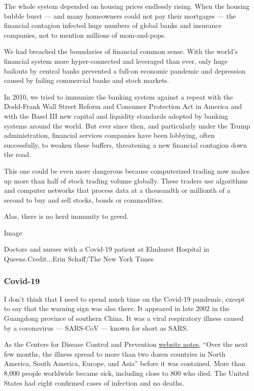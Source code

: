 The whole system depended on housing prices endlessly rising. When the
housing bubble burst --- and many homeowners could not pay their
mortgages --- the financial contagion infected huge numbers of global
banks and insurance companies, not to mention millions of mom-and-pops.

We had breached the boundaries of financial common sense. With the
world's financial system more hyper-connected and leveraged than ever,
only huge bailouts by central banks prevented a full-on economic
pandemic and depression caused by failing commercial banks and stock
markets.

In 2010, we tried to immunize the banking system against a repeat with
the Dodd-Frank Wall Street Reform and Consumer Protection Act in America
and with the Basel III new capital and liquidity standards adopted by
banking systems around the world. But ever since then, and particularly
under the Trump administration, financial services companies have been
lobbying, often successfully, to weaken these buffers, threatening a new
financial contagion down the road.

This one could be even more dangerous because computerized trading now
makes up more than half of stock trading volume globally. These traders
use algorithms and computer networks that process data at a thousandth
or millionth of a second to buy and sell stocks, bonds or commodities.

Alas, there is no herd immunity to greed.

Image

Doctors and nurses with a Covid-19 patient at Elmhurst Hospital in
Queens.Credit...Erin Schaff/The New York Times

\hypertarget{covid-19}{%
\subsubsection{Covid-19}\label{covid-19}}

I don't think that I need to spend much time on the Covid-19 pandemic,
except to say that the warning sign was also there. It appeared in late
2002 in the Guangdong province of southern China. It was a viral
respiratory illness caused by a coronavirus --- SARS-CoV --- known for
short as SARS.

As the Centers for Disease Control and Prevention
\href{https://www.cdc.gov/sars/about/fs-sars.html}{website notes},
``Over the next few months, the illness spread to more than two dozen
countries in North America, South America, Europe, and Asia'' before it
was contained. More than 8,000 people worldwide became sick, including
close to 800 who died. The United States had eight confirmed cases of
infection and no deaths.

